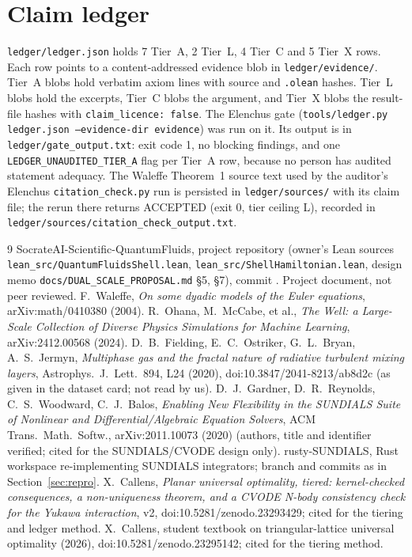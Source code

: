 \documentclass[11pt]{article}
\newcommand{\hash}[1]{{\ttfamily\expandafter\seqsplit\expandafter{#1}}}
\theoremstyle{remark}
\begin{document}
\section{Claim ledger}\label{sec:ledger}
\texttt{ledger/ledger.json} holds 7 Tier~A, 2 Tier~L, 4 Tier~C and 5 Tier~X rows. Each row points to a
content-addressed evidence blob in \texttt{ledger/evidence/}. Tier~A blobs hold verbatim axiom lines with source and
\texttt{.olean} hashes. Tier~L blobs hold the excerpts, Tier~C blobs the argument, and Tier~X blobs the result-file hashes
with \texttt{claim\_licence: false}. The Elenchus gate (\texttt{tools/ledger.py ledger.json --evidence-dir evidence}) was
run on it. Its output is in \texttt{ledger/gate\_output.txt}: exit code 1, no blocking findings, and one
\texttt{LEDGER\_UNAUDITED\_TIER\_A} flag per Tier~A row, because no person has audited statement adequacy. The Waleffe
Theorem~1 source text used by the auditor's Elenchus \texttt{citation\_check.py} run is persisted in \texttt{ledger/sources/}
with its claim file; the rerun there returns ACCEPTED (exit 0, tier ceiling L), recorded in
\texttt{ledger/sources/citation\_check\_output.txt}.

\begin{thebibliography}{9}\small
{} SocrateAI-Scientific-QuantumFluids, project repository (owner's Lean sources \texttt{lean\_src/QuantumFluidsShell.lean},
\texttt{lean\_src/ShellHamiltonian.lean}, design memo \texttt{docs/DUAL\_SCALE\_PROPOSAL.md} \S5, \S7), commit
\hash{10f74daf1b39d2ac51a785452329fff0003cfc83}. Project document, not peer reviewed.
 F.~Waleffe, \emph{On some dyadic models of the Euler equations}, arXiv:math/0410380 (2004).
 R.~Ohana, M.~McCabe, et al., \emph{The Well: a Large-Scale Collection of Diverse Physics Simulations for
Machine Learning}, arXiv:2412.00568 (2024).
 D.~B.~Fielding, E.~C.~Ostriker, G.~L.~Bryan, A.~S.~Jermyn, \emph{Multiphase gas and the fractal nature of
radiative turbulent mixing layers}, Astrophys.\ J.\ Lett.\ 894, L24 (2020), doi:10.3847/2041-8213/ab8d2c (as given in the dataset card; not read by us).
 D.~J.~Gardner, D.~R.~Reynolds, C.~S.~Woodward, C.~J.~Balos, \emph{Enabling New Flexibility in the SUNDIALS Suite of Nonlinear and
Differential/Algebraic Equation Solvers}, ACM Trans.\ Math.\ Softw., arXiv:2011.10073 (2020) (authors, title and
identifier verified; cited for the
SUNDIALS/CVODE design only).
 rusty-SUNDIALS, Rust workspace re-implementing SUNDIALS integrators; branch and commits as in
Section~\ref{sec:repro}.
 X.~Callens, \emph{Planar universal optimality, tiered: kernel-checked consequences, a non-uniqueness
theorem, and a CVODE N-body consistency check for the Yukawa interaction}, v2, doi:10.5281/zenodo.23293429; cited for the
tiering and ledger method.
 X.~Callens, student textbook on triangular-lattice universal optimality (2026),
doi:10.5281/zenodo.23295142; cited for the tiering method.
\end{thebibliography}
\end{document}
